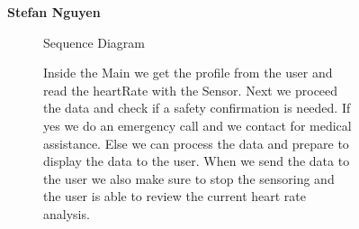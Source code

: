 \documentclass{article}
\begin{document}
	\begin{figure}[htbp]
		\textbf{Stefan Nguyen}
		\centering
		\begin{subfigure}{\textwidth}
			\resizebox{\textwidth}{!}{}
			\caption{Sequence Diagram}
		\end{subfigure}
		\begin{subfigure}{\textwidth}
			Inside the Main we get the profile from the user and read the heartRate with the Sensor. Next we proceed the data and check 
			if a safety confirmation is needed. If yes we do an emergency call and we contact for medical assistance. Else we can process 
			the data and prepare to display the data to the user. When we send the data to the user we also make sure to stop the sensoring and 
			the user is able to review the current heart rate analysis. 
		\end{subfigure}
	\end{figure}
	\newpage
\end{document}
